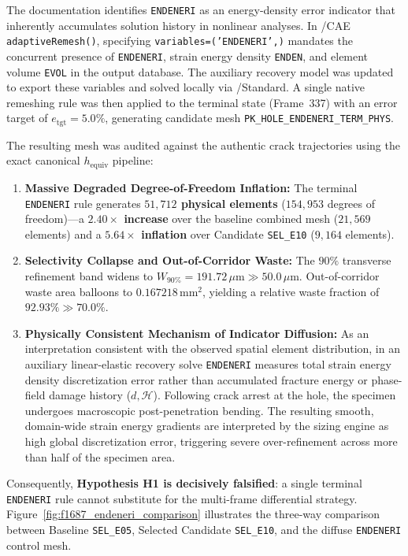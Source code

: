 The \Abaqus documentation identifies \texttt{ENDENERI} as an energy-density error indicator that inherently accumulates solution history in nonlinear analyses. In \Abaqus/CAE \texttt{adaptiveRemesh()}, specifying \texttt{variables=('ENDENERI',)} mandates the concurrent presence of \texttt{ENDENERI}, strain energy density \texttt{ENDEN}, and element volume \texttt{EVOL} in the output database. The auxiliary recovery model was updated to export these variables and solved locally via \Abaqus/Standard. A single native remeshing rule was then applied to the terminal state (Frame~337) with an error target of $e_{\mathrm{tgt}} = 5.0\%$, generating candidate mesh \texttt{PK\_HOLE\_ENDENERI\_TERM\_PHYS}.

The resulting mesh was audited against the authentic crack trajectories using the exact canonical $h_{\mathrm{equiv}}$ pipeline:
\begin{enumerate}
  \item \textbf{Massive Degraded Degree-of-Freedom Inflation:} The terminal \texttt{ENDENERI} rule generates \textbf{$51{,}712$ physical elements} ($154{,}953$ degrees of freedom)---a \textbf{$2.40\times$ increase} over the baseline combined mesh ($21{,}569$ elements) and a \textbf{$5.64\times$ inflation} over Candidate \texttt{SEL\_E10} ($9{,}164$ elements).
  \item \textbf{Selectivity Collapse and Out-of-Corridor Waste:} The $90\%$ transverse refinement band widens to $W_{90\%} = 191.72\,\mu\mathrm{m} \gg 50.0\,\mu\mathrm{m}$. Out-of-corridor waste area balloons to $0.167218\,\mathrm{mm}^2$, yielding a relative waste fraction of \textbf{$92.93\% \gg 70.0\%$}.
  \item \textbf{Physically Consistent Mechanism of Indicator Diffusion:} As an interpretation consistent with the observed spatial element distribution, in an auxiliary linear-elastic recovery solve \texttt{ENDENERI} measures total strain energy density discretization error rather than accumulated fracture energy or phase-field damage history ($d, \mathcal{H}$). Following crack arrest at the hole, the specimen undergoes macroscopic post-penetration bending. The resulting smooth, domain-wide strain energy gradients are interpreted by the sizing engine as high global discretization error, triggering severe over-refinement across more than half of the specimen area.
\end{enumerate}
Consequently, \textbf{Hypothesis H1 is decisively falsified}: a single terminal \texttt{ENDENERI} rule cannot substitute for the multi-frame differential strategy. Figure~\ref{fig:f1687_endeneri_comparison} illustrates the three-way comparison between Baseline \texttt{SEL\_E05}, Selected Candidate \texttt{SEL\_E10}, and the diffuse \texttt{ENDENERI} control mesh.

